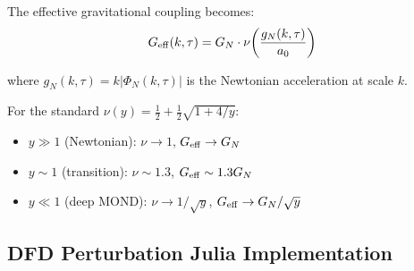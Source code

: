 \documentclass[11pt,a4paper]{article}
\begin{document}
The effective gravitational coupling becomes:
\begin{equation}
G_{\rm eff}(k, \tau) = G_N \cdot \nu\!\left(\frac{g_N(k, \tau)}{a_0}\right)
\end{equation}

where $g_N(k, \tau) = k|\Phi_N(k, \tau)|$ is the Newtonian acceleration at scale $k$.

For the standard $\nu(y) = \frac{1}{2} + \frac{1}{2}\sqrt{1 + 4/y}$:
\begin{itemize}
\item $y \gg 1$ (Newtonian): $\nu \to 1$, $G_{\rm eff} \to G_N$
\item $y \sim 1$ (transition): $\nu \sim 1.3$, $G_{\rm eff} \sim 1.3 G_N$
\item $y \ll 1$ (deep MOND): $\nu \to 1/\sqrt{y}$, $G_{\rm eff} \to G_N/\sqrt{y}$
\end{itemize}

\subsection{DFD Perturbation Julia Implementation}
\end{document}
